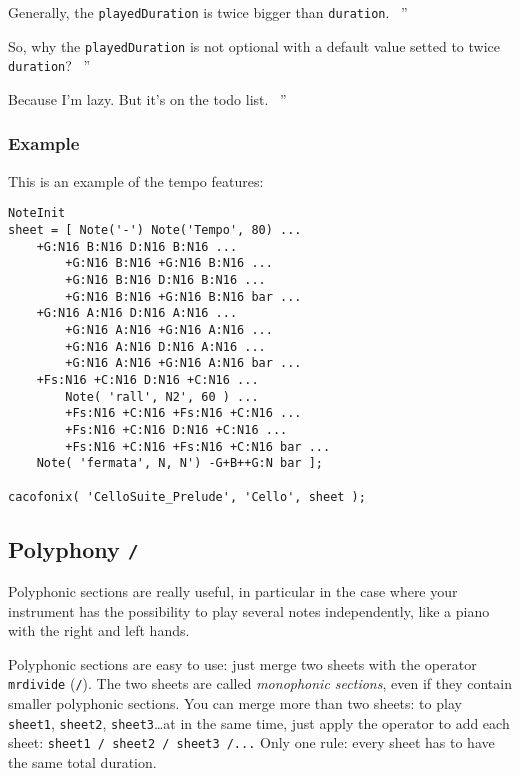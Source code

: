 \documentclass{article}
\newenvironment{meenv}{ \par \noindent \makebox[6em][r]{ \textcolor{mecolor}{Me}: `` --~}}{~''}
\newenvironment{myselfenv}{ \par \noindent \makebox[6em][r]{ \textcolor{myselfcolor}{Myself}: `` --~}}{~''}
\newcommand{ \me }[1]{%
\begin{meenv}%
	#1%
\end{meenv} }
\newcommand{ \myself }[1]{%
\begin{myselfenv}%
	#1%
\end{myselfenv} }
\begin{document}
\myself{Generally, the \lstinline!playedDuration! is twice bigger than \lstinline!duration!.}
\me{So, why the \lstinline!playedDuration! is not optional with a default value setted to twice \lstinline!duration!?}
\myself{Because I'm lazy. But it's on the todo list.}

\subsubsection{Example}

This is an example of the tempo features: \\

\begin{lstlisting}
NoteInit
sheet = [ Note('-') Note('Tempo', 80) ...
	+G:N16 B:N16 D:N16 B:N16 ...
		+G:N16 B:N16 +G:N16 B:N16 ...
		+G:N16 B:N16 D:N16 B:N16 ...
		+G:N16 B:N16 +G:N16 B:N16 bar ...
	+G:N16 A:N16 D:N16 A:N16 ...
		+G:N16 A:N16 +G:N16 A:N16 ...
		+G:N16 A:N16 D:N16 A:N16 ...
		+G:N16 A:N16 +G:N16 A:N16 bar ...
	+Fs:N16 +C:N16 D:N16 +C:N16 ...
		Note( 'rall', N2', 60 ) ...
		+Fs:N16 +C:N16 +Fs:N16 +C:N16 ...
		+Fs:N16 +C:N16 D:N16 +C:N16 ...
		+Fs:N16 +C:N16 +Fs:N16 +C:N16 bar ...
	Note( 'fermata', N, N') -G+B++G:N bar ];

cacofonix( 'CelloSuite_Prelude', 'Cello', sheet );
\end{lstlisting}

\subsection{Polyphony \lstinline!/!}
\label{sec:Polyphony}

Polyphonic sections are really useful, in particular in the case where your instrument has the possibility to play several notes independently, like a piano with the right and left hands.

Polyphonic sections are easy to use: just merge two sheets with the operator \lstinline!mrdivide! (\lstinline!/!). The two sheets are called \emph{monophonic sections}, even if they contain smaller polyphonic sections. You can merge more than two sheets: to play \lstinline!sheet1!, \lstinline!sheet2!, \lstinline!sheet3!\dots at in the same time, just apply the operator to add each sheet: \lstinline!sheet1 / sheet2 / sheet3 /...! Only one rule: every sheet has to have the same total duration.
\end{document}
